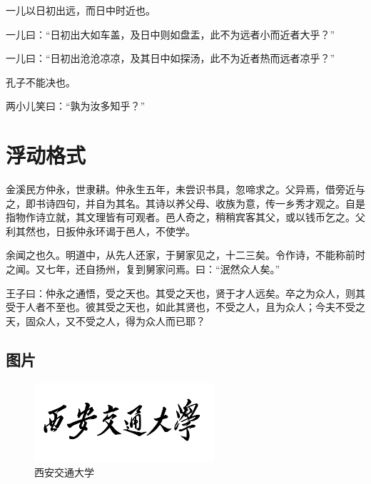 \documentclass[
    doctor,
    pdflinks,
    ]{xjtuthesis}
\begin{document}
                    一儿以日初出远，而日中时近也。

                    一儿曰：“日初出大如车盖，及日中则如盘盂，此不为远者小而近者大乎？”

                    一儿曰：“日初出沧沧凉凉，及其日中如探汤，此不为近者热而远者凉乎？”

                    孔子不能决也。

                    两小儿笑曰：“孰为汝多知乎？”

    \chapter{浮动格式}

        金溪民方仲永，世隶耕。仲永生五年，未尝识书具，忽啼求之。父异焉，借旁近与之，即书诗四句，并自为其名。其诗以养父母、收族为意，传一乡秀才观之。自是指物作诗立就，其文理皆有可观者。邑人奇之，稍稍宾客其父，或以钱币乞之。父利其然也，日扳仲永环谒于邑人，不使学。

        余闻之也久。明道中，从先人还家，于舅家见之，十二三矣。令作诗，不能称前时之闻。又七年，还自扬州，复到舅家问焉。曰：“泯然众人矣。”

        王子曰：仲永之通悟，受之天也。其受之天也，贤于才人远矣。卒之为众人，则其受于人者不至也。彼其受之天也，如此其贤也，不受之人，且为众人；今夫不受之天，固众人，又不受之人，得为众人而已耶？

        \section{图片}

            \begin{figure}[h!]
              \centering
              \includegraphics[width=6.67cm]{XJTU.pdf}
              \caption{西安交通大学}
              \label{fig:xjtu}
            \end{figure}
 
\end{document}
